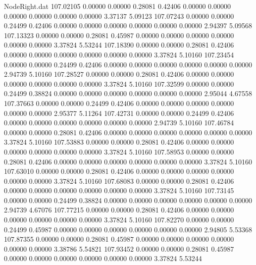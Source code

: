 \begin{filecontents}{NodeRight.dat}
 107.02105    0.00000    0.00000     0.28081    0.42406    0.00000    0.00000    0.00000    0.00000    0.00000    0.00000    3.37137    5.09123
 107.07243    0.00000    0.00000     0.24499    0.42406    0.00000    0.00000    0.00000    0.00000    0.00000    0.00000    2.94397    5.09568
 107.13323    0.00000    0.00000     0.28081    0.45987    0.00000    0.00000    0.00000    0.00000    0.00000    0.00000    3.37824    5.53244
 107.18390    0.00000    0.00000     0.28081    0.42406    0.00000    0.00000    0.00000    0.00000    0.00000    0.00000    3.37824    5.10160
 107.23454    0.00000    0.00000     0.24499    0.42406    0.00000    0.00000    0.00000    0.00000    0.00000    0.00000    2.94739    5.10160
 107.28527    0.00000    0.00000     0.28081    0.42406    0.00000    0.00000    0.00000    0.00000    0.00000    0.00000    3.37824    5.10160
 107.32599    0.00000    0.00000     0.24499    0.38824    0.00000    0.00000    0.00000    0.00000    0.00000    0.00000    2.95044    4.67558
 107.37663    0.00000    0.00000     0.24499    0.42406    0.00000    0.00000    0.00000    0.00000    0.00000    0.00000    2.95377    5.11264
 107.42731    0.00000    0.00000     0.24499    0.42406    0.00000    0.00000    0.00000    0.00000    0.00000    0.00000    2.94739    5.10160
 107.46784    0.00000    0.00000     0.28081    0.42406    0.00000    0.00000    0.00000    0.00000    0.00000    0.00000    3.37824    5.10160
 107.53883    0.00000    0.00000     0.28081    0.42406    0.00000    0.00000    0.00000    0.00000    0.00000    0.00000    3.37824    5.10160
 107.58953    0.00000    0.00000     0.28081    0.42406    0.00000    0.00000    0.00000    0.00000    0.00000    0.00000    3.37824    5.10160
 107.63010    0.00000    0.00000     0.28081    0.42406    0.00000    0.00000    0.00000    0.00000    0.00000    0.00000    3.37824    5.10160
 107.68083    0.00000    0.00000     0.28081    0.42406    0.00000    0.00000    0.00000    0.00000    0.00000    0.00000    3.37824    5.10160
 107.73145    0.00000    0.00000     0.24499    0.38824    0.00000    0.00000    0.00000    0.00000    0.00000    0.00000    2.94739    4.67076
 107.77215    0.00000    0.00000     0.28081    0.42406    0.00000    0.00000    0.00000    0.00000    0.00000    0.00000    3.37824    5.10160
 107.82270    0.00000    0.00000     0.24499    0.45987    0.00000    0.00000    0.00000    0.00000    0.00000    0.00000    2.94805    5.53368
 107.87355    0.00000    0.00000     0.28081    0.45987    0.00000    0.00000    0.00000    0.00000    0.00000    0.00000    3.38786    5.54821
 107.93452    0.00000    0.00000     0.28081    0.45987    0.00000    0.00000    0.00000    0.00000    0.00000    0.00000    3.37824    5.53244

\end{filecontents}
